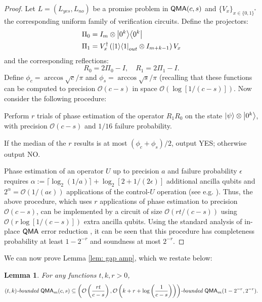\documentclass[11pt]{article}
\newtheorem{lemma}[theorem]{Lemma}
\theoremstyle{definition}
\theoremstyle{remark}
\newcommand\QMA{{\sf{QMA}}}
\newcommand\bddQMA[5]{{\left(#1,#2\right)}\textit{-bounded }\QMA_{#3}(#4,#5)}
\newcommand\bigoh{\mathcal{O}}
\begin{document}
\begin{proof}
	Let $L=(L_{yes}, L_{no})$ be a promise problem in $\QMA(c,s)$ and $\{V_x\}_{x\in\{0,1\}^*}$ the corresponding uniform family of verification circuits.
Define the projectors:
\begin{align}
\Pi_0 &= I_m \otimes {\left\vert{0^k}\right\rangle}{\left\langle{0^k}\right\vert} \\
\Pi_1 &= V^\dagger_x \left({\left\vert{1}\right\rangle}{\left\langle{1}\right\vert}_{out} \otimes I_{m+k-1}\right) V_x
\end{align}
and the corresponding reflections:
\begin{equation}
R_0 = 2\Pi_0 - I, \quad R_1 = 2\Pi_1 - I.
\end{equation}
Define $\phi_c = \arccos\sqrt{c}/\pi$ and $\phi_s = \arccos\sqrt{s}/\pi$ (recalling that these functions can be computed to precision $\bigoh (c-s)$ in space $\bigoh (\log[1/(c-s)])$. 
Now consider the following procedure:
\begin{compactenum}
\item Perform $r$ trials of phase estimation of the operator $R_1R_0$ on the state ${\left\vert{\psi}\right\rangle}\otimes {\left\vert{0^k}\right\rangle}$, with  precision $\mathcal{O}(c-s)$ and $1/16$ failure probability. 
\item If the median of the $r$ results is at most $(\phi_{c}+\phi_{s})/2$, output YES; otherwise output NO.
\end{compactenum}
Phase estimation of an operator $U$ up to precision $a$ and failure probability $\epsilon$ requires $\alpha := \lceil\log_2(1/a)\rceil + \log_2[2+1/(2\epsilon)]$ additional ancilla qubits and $2^\alpha = \mathcal{O}(1/(a\epsilon))$ applications of the control-$U$ operation (see e.g. \cite{nc00}).  Thus, the above procedure, which uses $r$ applications of phase estimation to precision $\mathcal{O}(c-s)$, can be implemented by a circuit of size $\mathcal{O}(rt/(c-s))$ using $\mathcal{O}(r\log[1/(c-s)])$ extra ancilla qubits. Using the standard analysis of in-place $\QMA$ error reduction \cite{mw05,nwz11}, it can be seen that this procedure has completeness probability at least $1-2^{-r}$ and soundness at most $2^{-r}$.
\end{proof}
We can now prove Lemma \ref{lem: gap amp}, which we restate below:
\begingroup
\def\thelemma{\ref{lem: gap amp}}
\begin{lemma}
For any functions $t,k,r>0$, 
\[
\bddQMA{t}{k}{m}{c}{s}\subseteq\bddQMA{\mathcal{O}\left(\frac{rt}{c-s}\right)}{\mathcal{O}\left(k+r+\log\left(\frac{1}{c-s}\right)\right)}{m}{1-2^{-r}}{2^{-r}}.
\]
\end{lemma}
\addtocounter{theorem}{-1}
\endgroup
\end{document}
